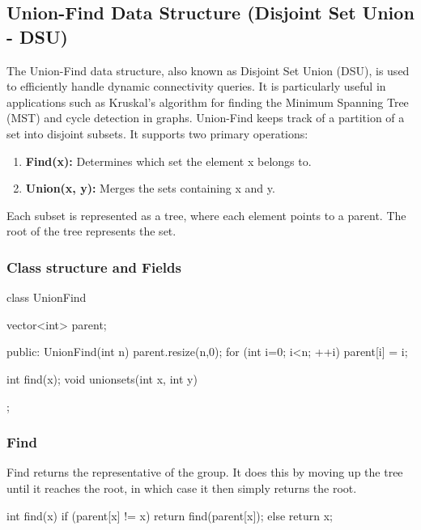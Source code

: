 \documentclass{report}
\begin{document}
\subsection{Union-Find Data Structure (Disjoint Set Union - DSU)}
\bigbreak \noindent 
The Union-Find data structure, also known as Disjoint Set Union (DSU), is used to efficiently handle dynamic connectivity queries. It is particularly useful in applications such as Kruskal's algorithm for finding the Minimum Spanning Tree (MST) and cycle detection in graphs.
\bigbreak \noindent 
Union-Find keeps track of a partition of a set into disjoint subsets. It supports two primary operations:
\begin{enumerate}
    \item \textbf{Find(x):} Determines which set the element x belongs to.
    \item \textbf{Union(x, y):} Merges the sets containing x and y.
\end{enumerate}
\bigbreak \noindent 
Each subset is represented as a tree, where each element points to a parent. The root of the tree represents the set.

\bigbreak \noindent 
\subsubsection{Class structure and Fields}
\bigbreak \noindent 
\begin{cppcode}
    class UnionFind {
        vector<int> parent;

    public:
        UnionFind(int n) {
            parent.resize(n,0);
            for (int i=0; i<n; ++i) {
                parent[i] = i;
            }
        }

        int find(x);
        void unionsets(int x, int y)
    };
\end{cppcode}

\bigbreak \noindent 
\subsubsection{Find}
\bigbreak \noindent 
Find returns the representative of the group. It does this by moving up the tree until it reaches the root, in which case it then simply returns the root.
\bigbreak \noindent 
\begin{cppcode}
    int find(x) {
        if (parent[x] != x) {
            return find(parent[x]);
        } else {
            return x;
        }
    }
\end{cppcode}
\end{document}
